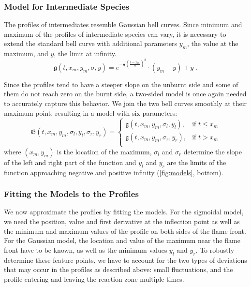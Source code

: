 \subsubsection{Model for Intermediate Species} %
\label{ssub:model_for_intermediate_species}
%
The profiles of intermediates resemble Gaussian bell curves.
%
Since minimum and maximum of the profiles of intermediate species can vary, it
is necessary to extend the standard bell curve with additional parameters $y_m$,
the value at the maximum, and $y$, the limit at infinity.
%
\begin{equation}
	\mathfrak{g}(t, x_m, y_m, \sigma, y)
		= e^{-\frac{1}{2}(\frac{t-x_m}{\sigma})^2}\cdot(y_m-y)+y \text{ .}
\end{equation}
%

%
Since the profiles tend to have a steeper slope on the unburnt side and some of
them do not reach zero on the burnt side, a two-sided model is once again needed
to accurately capture this behavior.
%
We join the two bell curves smoothly at their maximum point, resulting in a
model with six parameters:
%
\begin{equation}
	\mathfrak{G}(t, x_m, y_m, \sigma_l, y_l, \sigma_r, y_r) =
	\begin{cases}
		\mathfrak{g}(t, x_m, y_m, \sigma_l, y_l), & \text{if }  t \leq x_m\\
		\mathfrak{g}(t, x_m, y_m, \sigma_r, y_r), & \text{if }  t > x_m\\
	\end{cases}
\end{equation}
%
where $(x_m, y_m)$ is the location of the maximum, $\sigma_l$ and $\sigma_r$
determine the slope of the left and right part of the function and $y_l$ and
$y_r$ are the limits of the function approaching negative and positive infinity
(\cref{fig:models}, bottom).
%
% 	
%
%
\subsubsection{Fitting the Models to the Profiles} %
\label{ssub:fitting_the_models}
%
We now approximate the profiles by fitting the models.
%
For the sigmoidal model, we need the position, value and first derivative at the
inflection point as well as the minimum and maximum values of the profile on
both sides of the flame front.
%
For the Gaussian model, the location and value of the maximum near the flame
front have to be known, as well as the minimum values $y_l$ and $y_r$.
%
To robustly determine these feature points, we have to account for the two types
of deviations that may occur in the profiles as described above:
%
small fluctuations, and the profile entering and leaving the reaction zone
multiple times.
%

